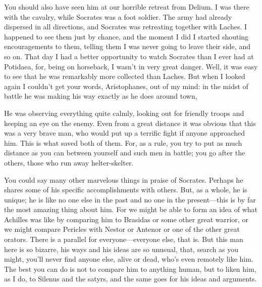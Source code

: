  You should also have seen him at our horrible retreat
from Delium. I was
there with the cavalry, while Socrates was a foot soldier. The army had
already dispersed in all directions, and Socrates was retreating
together with Laches. I happened to see them just by chance, and the
moment I did I started shouting encouragements to them, telling them I
was never going to leave their side, and so on. That day I had a better
opportunity  to watch Socrates than I ever had at Potidaea, for,
being on horseback, I wasn't in very great danger. Well, it was easy to
see that he was remarkably more collected than Laches. But when I looked
again I couldn't get your words, Aristophanes, out of my mind: in the
midst of battle he was making his way exactly as he does around
town,

\blank[line]


\blank[line]

He was observing everything quite calmly, looking out for friendly
troops and keeping an eye on the enemy. Even from a great distance it
was obvious that this was a very brave man, who would put up a terrific
fight if anyone approached him. This is what saved both of them. For, as
a rule, you try to put as much distance as you can between yourself and
such men in battle; you go after the others, those who run away
helter-skelter. 

You could say many other marvelous things in praise of Socrates. Perhaps
he shares some of his specific accomplishments with others. But, as a
whole, he is unique; he is like no one else in the past and no one in
the present---this is by far the most amazing thing about him. For we
might be able to form an idea of what Achilles was like by comparing him
to Brasidas or some other great warrior, or we might compare Pericles
with Nestor or Antenor or one of the other great
orators. There is a
parallel  for everyone---everyone else, that is. But this man
here is so bizarre, his ways and his ideas are so unusual, that, search
as you might, you'll never find anyone else, alive or dead, who's even
remotely like him. The best you can do is not to compare him to anything
human, but to liken him, as I do, to Silenus and the satyrs, and the
same goes for his ideas and arguments.

